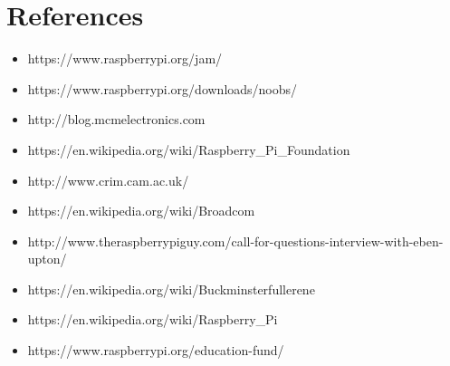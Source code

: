 \documentclass[10pt,a4paper]{article}
\begin{document}
\section{References}

\begin{itemize}
\item https://www.raspberrypi.org/jam/
\item https://www.raspberrypi.org/downloads/noobs/
\item http://blog.mcmelectronics.com
\item https://en.wikipedia.org/wiki/Raspberry\_Pi\_Foundation
\item http://www.crim.cam.ac.uk/
\item https://en.wikipedia.org/wiki/Broadcom
\item http://www.theraspberrypiguy.com/call-for-questions-interview-with-eben-upton/
\item https://en.wikipedia.org/wiki/Buckminsterfullerene
\item https://en.wikipedia.org/wiki/Raspberry\_Pi
\item https://www.raspberrypi.org/education-fund/

\end{itemize}
\end{document}
